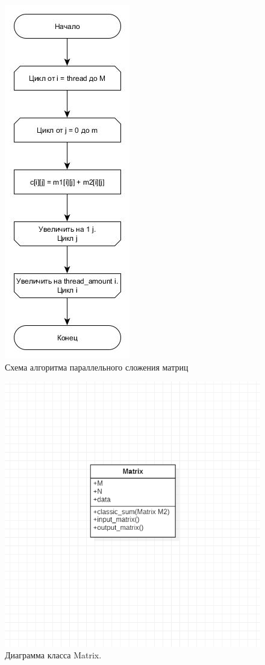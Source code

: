 \begin{figure}
    \centering
    \includegraphics[scale=0.75]{parallel.jpg}
    \caption{Схема алгоритма параллельного сложения матриц}
    \label{img:parallel}
\end{figure}

\begin{figure}
    \centering
    \includegraphics[scale=0.75]{diag_class.png}
    \caption{Диаграмма класса Matrix.}
    \label{img:diag}
\end{figure}

